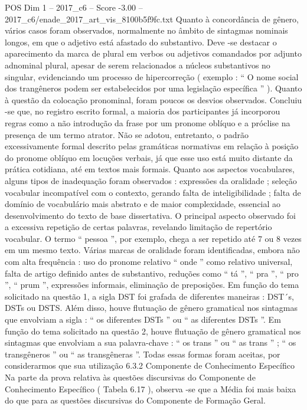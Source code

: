 \begin{textsample}{POS Dim 1 – 2017\_c6 – Score -3.00 – 2017\_c6/enade\_2017\_art\_vis\_8100b5f9fc.txt}
Quanto à concordância de gênero, vários casos foram observados, normalmente no âmbito de sintagmas nominais longos, em que o adjetivo está afastado do substantivo.
Deve -se destacar o aparecimento da marca de plural em verbos ou adjetivos comandados por adjunto adnominal plural, apesar de serem relacionados a núcleos substantivos no singular, evidenciando um processo de hipercorreção ( exemplo : “ O nome social dos trangêneros podem ser estabelecidos por uma legislação específica ” ).
Quanto à questão da colocação pronominal, foram poucos os desvios observados.
Concluiu -se que, no registro escrito formal, a maioria dos participantes já incorporou regras como a não introdução da frase por um pronome oblíquo e a próclise na presença de um termo atrator.
Não se adotou, entretanto, o padrão excessivamente formal descrito pelas gramáticas normativas em relação à posição do pronome oblíquo em locuções verbais, já que esse uso está muito distante da prática cotidiana, até em textos mais formais.
Quanto aos aspectos vocabulares, alguns tipos de inadequação foram observados : expressões da oralidade ; seleção vocabular incompatível com o contexto, gerando falta de inteligibilidade ; falta de domínio de vocabulário mais abstrato e de maior complexidade, essencial ao desenvolvimento do texto de base dissertativa.
O principal aspecto observado foi a excessiva repetição de certas palavras, revelando limitação de repertório vocabular.
O termo “ pessoa ”, por exemplo, chega a ser repetido até 7 ou 8 vezes em um mesmo texto.
Várias marcas de oralidade foram identificadas, embora não com alta frequência : uso do pronome relativo “ onde ” como relativo universal, falta de artigo definido antes de substantivo, reduções como “ tá ”, “ pra ”, “ pro ”, “ prum ”, expressões informais, eliminação de preposições.
Em função do tema solicitado na questão 1, a sigla DST foi grafada de diferentes maneiras : DST´s, DSTs ou DSTS.
Além disso, houve flutuação de gênero gramatical nos sintagmas que envolviam a sigla : “ os diferentes DSTs ” ou “ as diferentes DSTs ”.
Em função do tema solicitado na questão 2, houve flutuação de gênero gramatical nos sintagmas que envolviam a sua palavra-chave : “ os trans ” ou “ as trans ” ; “ os transgêneros ” ou “ as transgêneras ”.
Todas essas formas foram aceitas, por considerarmos que sua utilização 6.3.2 Componente de Conhecimento Específico Na parte da prova relativa às questões discursivas do Componente de Conhecimento Específico ( Tabela 6.17 ), observa -se que a Média foi mais baixa do que para as questões discursivas do Componente de Formação Geral.

\end{textsample}
